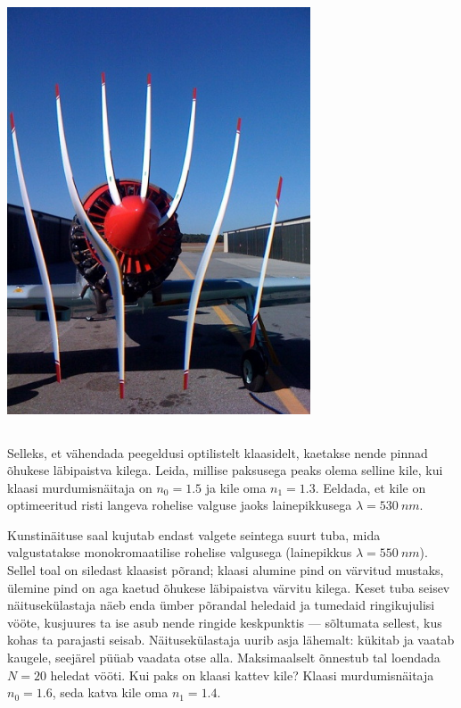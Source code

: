 \documentclass[10pt, twoside]{article}
\begin{document}
{\begin{center}
	\includegraphics[width=90mm]{2010-v3g-10-Propeller.jpg}
\end{center}
\probend
\bigskip
\newpage\subsection{\protect{}}


Selleks, et vähendada peegeldusi optilistelt klaasidelt, kaetakse nende pinnad õhukese läbipaistva kilega. Leida, millise paksusega peaks olema selline kile, kui klaasi murdumisnäitaja on $n_0 = \num{1,5}$ ja kile oma $n_1 = \num{1,3}$. Eeldada, et kile on optimeeritud risti langeva rohelise valguse jaoks lainepikkusega $\lambda = \SI{530}{nm}$.
\probend
\bigskip


Kunstinäituse saal kujutab endast valgete seintega suurt tuba, mida valgustatakse monokromaatilise rohelise valgusega (lainepikkus $\lambda=\SI{550}{nm}$).
Sellel toal on siledast klaasist põrand; klaasi
alumine pind on värvitud mustaks, ülemine pind on aga kaetud õhukese läbipaistva värvitu kilega.
Keset tuba seisev näitusekülastaja
näeb enda ümber põrandal heledaid ja tumedaid ringikujulisi vööte, kusjuures ta ise asub nende ringide keskpunktis --- sõltumata sellest, kus kohas ta parajasti seisab. Näitusekülastaja uurib asja lähemalt: kükitab ja vaatab kaugele, seejärel püüab vaadata otse alla. Maksimaalselt õnnestub tal loendada $N=\num{20}$ heledat vööti. Kui paks on klaasi kattev kile?
Klaasi murdumisnäitaja $n_0=\num{1.6}$, seda katva kile oma $n_1=\num{1.4}$.
\probend
\bigskip
\newpage\subsection{\protect{}}

}
\end{document}
